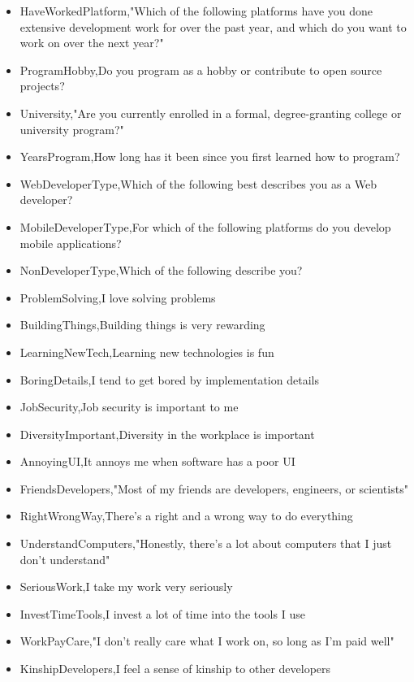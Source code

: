 \begin{appendices}
\begin{itemize}
        \item HaveWorkedPlatform,"Which of the following platforms have you done extensive development work for over the past year, and which do you want to work on over the next year?"
        \item ProgramHobby,Do you program as a hobby or contribute to open source projects?
        \item University,"Are you currently enrolled in a formal, degree-granting college or university program?"
        \item YearsProgram,How long has it been since you first learned how to program?
        \item WebDeveloperType,Which of the following best describes you as a Web developer?
        \item MobileDeveloperType,For which of the following platforms do you develop mobile applications?
        \item NonDeveloperType,Which of the following describe you?
        \item ProblemSolving,I love solving problems
        \item BuildingThings,Building things is very rewarding
        \item LearningNewTech,Learning new technologies is fun
        \item BoringDetails,I tend to get bored by implementation details
        \item JobSecurity,Job security is important to me
        \item DiversityImportant,Diversity in the workplace is important
        \item AnnoyingUI,It annoys me when software has a poor UI
        \item FriendsDevelopers,"Most of my friends are developers, engineers, or scientists"
        \item RightWrongWay,There's a right and a wrong way to do everything
        \item UnderstandComputers,"Honestly, there's a lot about computers that I just don't understand"
        \item SeriousWork,I take my work very seriously
        \item InvestTimeTools,I invest a lot of time into the tools I use
        \item WorkPayCare,"I don't really care what I work on, so long as I'm paid well"
        \item KinshipDevelopers,I feel a sense of kinship to other developers

\end{itemize}
\end{appendices}

